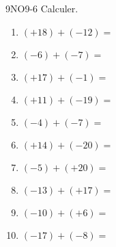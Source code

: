 \documentclass[a4paper,12pt]{report}
\begin{document}
\begin{EXO}{}{9NO9-6}
Calculer.
\begin{multicols}{3}
\begin{enumerate}[itemsep=0.5em]
	\item \begin{minipage}[t]{\linewidth} $ (+18) + (-12) =$ \end{minipage}
	\item \begin{minipage}[t]{\linewidth} $ (-6) + (-7) =$ \end{minipage}
	\item \begin{minipage}[t]{\linewidth} $ (+17) + (-1) =$ \end{minipage}
	\item \begin{minipage}[t]{\linewidth} $ (+11) + (-19) =$ \end{minipage}
	\item \begin{minipage}[t]{\linewidth} $ (-4) + (-7) =$ \end{minipage}
	\item \begin{minipage}[t]{\linewidth} $ (+14) + (-20) =$ \end{minipage}
	\item \begin{minipage}[t]{\linewidth} $ (-5) + (+20) =$ \end{minipage}
	\item \begin{minipage}[t]{\linewidth} $ (-13) + (+17) =$ \end{minipage}
	\item \begin{minipage}[t]{\linewidth} $ (-10) + (+6) =$ \end{minipage}
	\item \begin{minipage}[t]{\linewidth} $ (-17) + (-8) =$ \end{minipage}
\end{enumerate}
\end{multicols}
\end{EXO}
\end{document}
